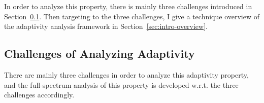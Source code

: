 In order to analyze this property, there is mainly three challenges introduced in Section~\ref{sec:intro-challenge}.
Then targeting to the three challenges, I give a technique overview of the adaptivity analysis framework in Section~\ref{sec:intro-overview}.

\subsection{Challenges of Analyzing Adaptivity}
\label{sec:intro-challenge}
There are mainly three challenges in order to analyze this adaptivity property, 
and the full-spectrum analysis of this property is 
developed w.r.t. the three challenges accordingly.

